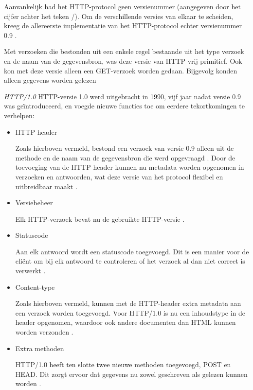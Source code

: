 Aanvankelijk had het HTTP-protocol geen versienummer (aangegeven door het cijfer achter het teken /). Om de verschillende versies van elkaar te scheiden, kreeg de allereerste implementatie van het HTTP-protocol echter versienummer 0.9 \autocite{MDN2023a}.

Met verzoeken die bestonden uit een enkele regel bestaande uit het type verzoek en de naam van de gegevensbron, was deze versie van HTTP vrij primitief. Ook kon met deze versie alleen een GET-verzoek worden gedaan. Bijgevolg konden alleen gegevens worden gelezen \autocite{Grigorik}


\emph{HTTP/1.0}
HTTP-versie 1.0 werd uitgebracht in 1990, vijf jaar nadat versie 0.9 was geïntroduceerd, en voegde nieuwe functies toe om eerdere tekortkomingen te verhelpen:

\begin{itemize}
    \item HTTP-header
    
    Zoals hierboven vermeld, bestond een verzoek van versie 0.9 alleen uit de methode en de naam van de gegevensbron die werd opgevraagd \autocite{FulberGarcia2022}.
    Door de toevoeging van de HTTP-header kunnen nu metadata worden opgenomen in verzoeken en antwoorden, wat deze versie van het protocol flexibel en uitbreidbaar maakt \autocite{MDN2023a}.
    
    \item Versiebeheer
    
    Elk HTTP-verzoek bevat nu de gebruikte HTTP-versie \autocite{MDN2023a}.
    
    \item Statuscode
    
    Aan elk antwoord wordt een statuscode toegevoegd. Dit is een manier voor de cliënt om bij elk antwoord te controleren of het verzoek al dan niet correct is verwerkt \autocite{FulberGarcia2022}.
    
    \item Content-type
    
    Zoals hierboven vermeld, kunnen met de HTTP-header extra metadata aan een verzoek worden toegevoegd. Voor HTTP/1.0 is nu een inhoudstype in de header opgenomen, waardoor ook andere documenten dan HTML kunnen worden verzonden \autocite{FulberGarcia2022}.
    
    \item Extra methoden
    
    HTTP/1.0 heeft ten slotte twee nieuwe methoden toegevoegd, POST en HEAD. Dit zorgt ervoor dat gegevens nu zowel geschreven als gelezen kunnen worden \autocite{FulberGarcia2022}.
\end{itemize}


